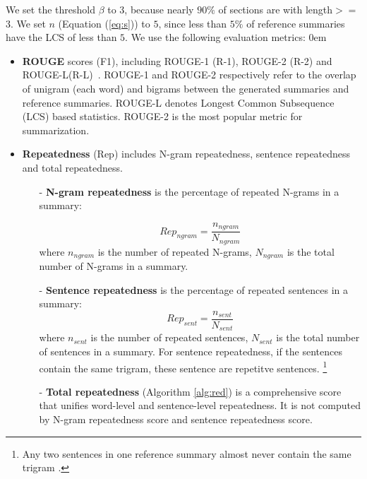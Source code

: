 \documentclass{nle}
\theoremstyle{definition}
\begin{document}
We set the threshold $\beta$ to $3$, 
because nearly $90\%$ 
of sections are with length$>=$3.
We set $n$ (Equation (\ref{eq:s})) to $5$,
since less than $5\%$ of reference summaries have
the LCS of less than $5$.
We use the following evaluation metrics:
\itemsep0em
\begin{itemize}
	
	\item \textbf{ROUGE} scores (F1), including ROUGE-1 (R-1), ROUGE-2 (R-2) and
	ROUGE-L(R-L)~\citep{rouge-a-package-for-automatic-evaluation-of-summaries}.
	ROUGE-1 and ROUGE-2 respectively refer to the overlap of unigram (each word) and bigrams between the generated summaries and reference summaries.
	ROUGE-L denotes Longest Common Subsequence (LCS) based statistics.
	ROUGE-2 is the most popular metric for summarization.
	
	\item \textbf{Repeatedness} (Rep) 
	includes N-gram repeatedness, sentence repeatedness
	and total repeatedness.
	\begin{itemize}
		\item[-] \textbf{N-gram repeatedness} is the percentage of repeated N-grams 
		in a summary:
		
		\begin{equation}
			Rep_{ngram} = \frac{n_{ngram}}{N_{ngram}}
		\end{equation}
		where $n_{ngram}$ is the number of repeated N-grams, 
		$N_{ngram}$ is the total number of N-grams in a summary.
		\item[-] \textbf{Sentence repeatedness} is the percentage of repeated 
		sentences in a summary:
		\begin{equation}
			Rep_{sent} = \frac{n_{sent}}{N_{sent}}
		\end{equation}
		where $n_{sent}$ is the number of repeated sentences, 
		$N_{sent}$ is the total number of sentences in a summary.
		For sentence repeatedness, if the sentences contain the same trigram,
		these sentence are repetitve sentences.
		\footnote{
			Any two sentences in one reference summary almost never contain 
			the same trigram \citep{PaulusXS17}.}
		\item[-] 
		\textbf{Total repeatedness} (Algorithm \ref{alg:red}) is a comprehensive score
		that unifies word-level and sentence-level repeatedness.
		It is not computed by N-gram repeatedness score 
		and sentence repeatedness score.
		

\end{itemize}
\end{itemize}
\end{document}
